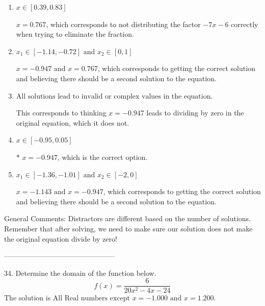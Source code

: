 \documentclass{article}[14pt]
\begin{document}
\begin{enumerate}[label=\Alph*.] 
\item $ x \in [0.39,0.83] $ 

 $x = 0.767$, which corresponds to not distributing the factor $-7x -6$ correctly when trying to eliminate the fraction. 
\item $ x_1 \in [-1.14, -0.72] \text{ and } x_2 \in [0,1] $ 

 $x = -0.947 \text{ and } x = 0.767$, which corresponds to getting the correct solution and believing there should be a second solution to the equation. 
\item $ \text{All solutions lead to invalid or complex values in the equation.} $ 

 This corresponds to thinking $x = -0.947$ leads to dividing by zero in the original equation, which it does not. 
\item $ x \in [-0.95,0.05] $ 

 * $x = -0.947$, which is the correct option. 
\item $ x_1 \in [-1.36, -1.01] \text{ and } x_2 \in [-2,0] $ 

 $x = -1.143 \text{ and } x = -0.947$, which corresponds to getting the correct solution and believing there should be a second solution to the equation. 
\end{enumerate} 
 
General Comments: Distractors are different based on the number of solutions. Remember that after solving, we need to make sure our solution does not make the original equation divide by zero!

-----------------------------------------------

34. Determine the domain of the function below.
$$ f(x) = \frac{6}{20x^{2} -4 x -24} $$ 
The solution is $ \text{All Real numbers except } x = -1.000 \text{ and } x = 1.200. $ 
\end{document}
